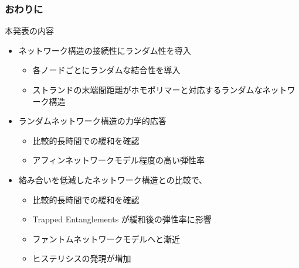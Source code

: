 \documentclass[12pt, dvipdfmx]{beamer}
\begin{document}
\begin{frame}
	\frametitle{おわりに}
		\begin{block}{本発表の内容}
			\begin{itemize}
			\item ネットワーク構造の接続性にランダム性を導入
				\begin{itemize}
					\item 各ノードごとにランダムな結合性を導入
					\item ストランドの末端間距離がホモポリマーと対応するランダムなネットワーク構造
				\end{itemize}
			\item ランダムネットワーク構造の力学的応答
				\begin{itemize}
					\item 比較的長時間での緩和を確認
					\item アフィンネットワークモデル程度の高い弾性率
				\end{itemize}
			\item 絡み合いを低減したネットワーク構造との比較で、
				\begin{itemize}
					\item 比較的長時間での緩和を確認
					\item Trapped Entanglements が緩和後の弾性率に影響 
					\item ファントムネットワークモデルへと漸近
					\item ヒステリシスの発現が増加
				\end{itemize}
			\end{itemize}
		\end{block}
\end{frame}
\end{document}

